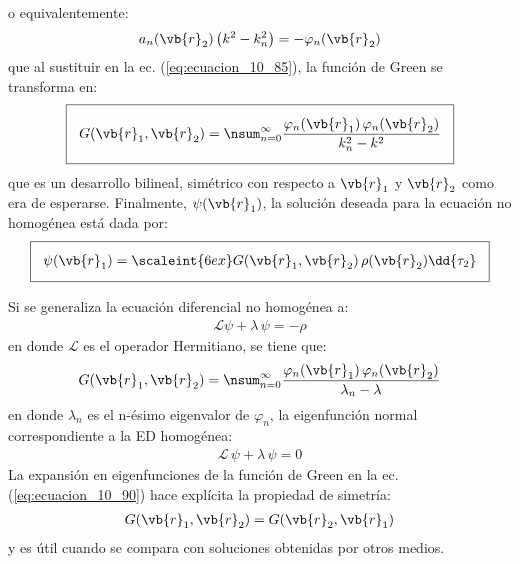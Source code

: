 o equivalentemente:
\begin{align*}
a_{n} (\vb{r}_{2}) \, \big( k^{2} - k_{n}^{2} \big) = - \varphi_{n} (\vb{r}_{2})
\end{align*}
que al sustituir en la ec. (\ref{eq:ecuacion_10_85}), la función de Green se transforma en:
\begin{align}
\setlength{\fboxsep}{3\fboxsep}\boxed{
G (\vb{r}_{1}, \vb{r}_{2}) = \nsum_{n=0}^{\infty} \dfrac{\varphi_{n} (\vb{r}_{1}) \, \varphi_{n} (\vb{r}_{2})}{k_{n}^{2} - k^{2}}}
\label{eq:ecuacion_10_87}
\end{align}
que es un desarrollo bilineal, simétrico con respecto a $\vb{r}_{1}$ y $\vb{r}_{2}$ como era de esperarse. Finalmente, $\psi (\vb{r}_{1})$, la solución deseada para la ecuación no homogénea está dada por:
\begin{align}
\setlength{\fboxsep}{3\fboxsep}\boxed{
\psi (\vb{r}_{1}) = \scaleint{6ex} G (\vb{r}_{1}, \vb{r}_{2}) \, \rho (\vb{r}_{2}) \dd{\tau_{2}}}
\label{eq:ecuacion_10_88}
\end{align}

Si se generaliza la ecuación diferencial no homogénea a:
\begin{align}
\mathcal{L} \psi + \lambda \, \psi = - \rho
\label{eq:ecuacion_10_89}
\end{align}
en donde $\mathcal{L}$ es el operador Hermitiano, se tiene que:
\begin{align}
G (\vb{r}_{1}, \vb{r}_{2}) = \nsum_{n=0}^{\infty} \dfrac{\varphi_{n} (\vb{r}_{1}) \, \varphi_{n} (\vb{r}_{2})}{\lambda_{n} - \lambda}
\label{eq:ecuacion_10_90}
\end{align}
en donde $\lambda_{n}$ es el n-ésimo eigenvalor de $\varphi_{n}$, la eigenfunción normal correspondiente a la ED homogénea:
\begin{align}
\mathcal{L} \, \psi + \lambda \, \psi = 0
\label{eq:ecuacion_10_91}
\end{align}
La expansión en eigenfunciones de la función de Green en la ec. (\ref{eq:ecuacion_10_90}) hace explícita la propiedad de simetría:
\begin{align*}
G (\vb{r}_{1}, \vb{r}_{2}) = G (\vb{r}_{2}, \vb{r}_{1})
\end{align*}
y es útil cuando se compara con soluciones obtenidas por otros medios.





